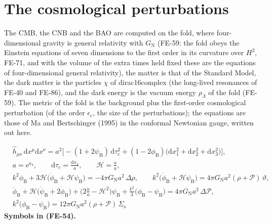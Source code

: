 \documentclass[
  10pt,
]{article}
\begin{document}
\hypertarget{the-cosmological-perturbations}{%
\section{The cosmological
perturbations}\label{the-cosmological-perturbations}}

The CMB, the CNB and the BAO are computed on the fold, where
four-dimensional gravity is general relativity with \(G_{\mathrm{N}}\)
(FE-59: the fold obeys the Einstein equations of seven dimensions to the
first order in its curvature over \(H^2\), FE-71, and with the volume of
the extra times held fixed these are the equations of four-dimensional
general relativity), the matter is that of the Standard Model, the dark
matter is the particles \(\chi\) of dirac16complex (the long-lived
resonances of FE-40 and FE-86), and the dark energy is the vacuum energy
\(\rho_\Lambda\) of the fold (FE-59). The metric of the fold is the
background plus the first-order cosmological perturbation (of the order
\(\epsilon_{\mathrm{c}}\), the size of the perturbations); the equations
are those of Ma and Bertschinger (1995) in the conformal Newtonian
gauge, written out here.

\[
\begin{aligned}
&\hat h_{\mu\nu}\,\mathrm{d}x^\mu\mathrm{d}x^\nu = a^2\Big[-(1 + 2\psi_{\mathrm{B}})\,\mathrm{d}\tau_{\mathrm{c}}^2
 + (1 - 2\phi_{\mathrm{B}})\big(\mathrm{d}x_1^2 + \mathrm{d}x_2^2 + \mathrm{d}x_3^2\big)\Big],\\
&a = \mathrm{e}^{a_4},\qquad \mathrm{d}\tau_{\mathrm{c}} = \frac{\mathrm{d}x_4}{a},\qquad \mathcal{H} = \frac{\dot a}{a},\\
&k^2\phi_{\mathrm{B}} + 3\mathcal{H}\big(\dot\phi_{\mathrm{B}} + \mathcal{H}\psi_{\mathrm{B}}\big) = -4\pi G_{\mathrm{N}}a^2\,\Delta\rho,\qquad
 k^2\big(\dot\phi_{\mathrm{B}} + \mathcal{H}\psi_{\mathrm{B}}\big) = 4\pi G_{\mathrm{N}}a^2(\rho + \mathcal{P})\,\vartheta,\\
&\ddot\phi_{\mathrm{B}} + \mathcal{H}\big(\dot\psi_{\mathrm{B}} + 2\dot\phi_{\mathrm{B}}\big) + \Big(2\frac{\ddot a}{a} - \mathcal{H}^2\Big)\psi_{\mathrm{B}}
 + \frac{k^2}{3}\big(\phi_{\mathrm{B}} - \psi_{\mathrm{B}}\big) = 4\pi G_{\mathrm{N}}a^2\,\Delta\mathcal{P},\\
&k^2\big(\phi_{\mathrm{B}} - \psi_{\mathrm{B}}\big) = 12\pi G_{\mathrm{N}}a^2(\rho + \mathcal{P})\,\Sigma_{\mathrm{s}}
\end{aligned} \tag{FE-54}
\] \textbf{Symbols in (FE-54).}
\end{document}

